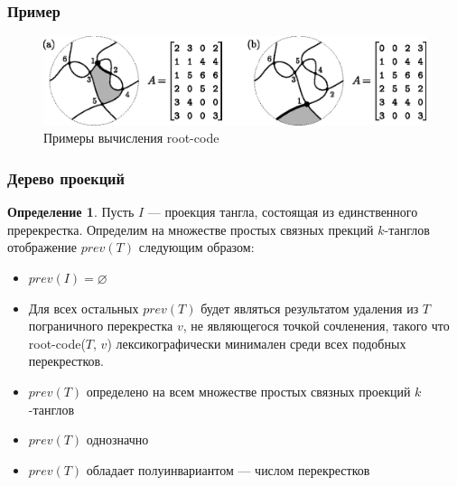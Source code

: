 \documentclass[dvips, intlimits, 9pt, unicode, notheorems]{beamer}
\theoremstyle{plain}
\theoremstyle{definition}
\newtheorem{definition}{Определение}
\begin{document}
	\begin{frame}
		\frametitle{Пример}

		\begin{figure}[ht]
			\centering
			\includegraphics[scale = 0.7]{c/rcode-example.eps}
			\caption{Примеры вычисления root-code\label{figure:rcode-example}}
		\end{figure}
	\end{frame}


	\begin{frame}
		\frametitle{Дерево проекций}

		\begin{definition}
			Пусть $I$ --- проекция тангла, состоящая из единственного пререкрестка. Определим на множестве простых связных
			прекций $k$-танглов отображение $prev(T)$ следующим образом:
			\begin{itemize}
				\item
				$prev(I) = \varnothing$

				\item
				Для всех остальных $prev(T)$ будет являться результатом удаления из $T$ пограничного перекрестка $v$, не
				являющегося точкой сочленения, такого что root-code($T$, $v$) лексикографически минимален среди всех подобных
				перекрестков.
			\end{itemize}
		\end{definition}

		\begin{itemize}
			\item
			$prev(T)$ определено на всем множестве простых связных проекций $k$-танглов

			\item
			$prev(T)$ однозначно

			\item
			$prev(T)$ обладает полуинвариантом --- числом перекрестков
		\end{itemize}
	\end{frame}
\end{document}
